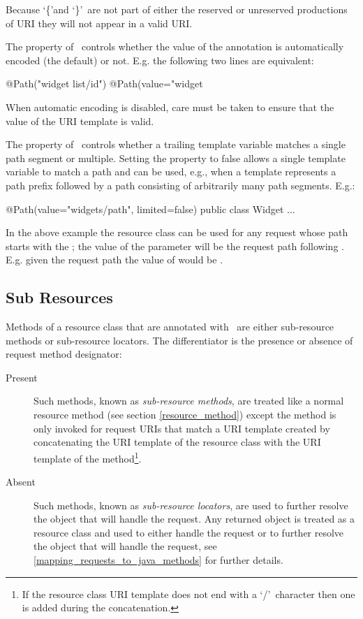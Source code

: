 \begin{nnnote}Because \lq\{\rq and \lq\}\rq\ are not part of either the reserved or unreserved productions of URI\cite{uri} they will not appear in a valid URI.\end{nnnote}

The  property of \Path\ controls whether the value of the annotation is automatically encoded (the default) or not. E.g. the following two lines are equivalent:

\begin{listing}{1}
@Path("widget list/{id}")
@Path(value="widget%
\end{listing}

When automatic encoding is disabled, care must be taken to ensure that the value of the URI template is valid.

The  property of \Path\ controls whether a trailing template variable matches a single path segment or multiple. Setting the property to false allows a single template variable to match a path and can be used, e.g., when a template represents a path prefix followed by a path consisting of arbitrarily many path segments. E.g.:

\begin{listing}{1}
@Path(value="widgets/{path}", limited=false)
public class Widget {
  ...
}\end{listing}

In the above example the  resource class can be used for any request whose path starts with the ; the value of the  parameter will be the request path following . E.g. given the request path  the value of  would be .

\subsection{Sub Resources}
\label{sub_resources}

Methods of a resource class that are annotated with \Path\ are either sub-resource methods or sub-resource locators. The differentiator is the presence or absence of request method designator:

\begin{description}
\item[Present] Such methods, known as {\em sub-resource methods}, are treated like a normal resource method (see section \ref{resource_method}) except the method is only invoked for request URIs that match a URI template created by concatenating the URI template of the resource class with the URI template of the method\footnote{If the resource class URI template does not end with a \lq/\rq\ character then one is added during the concatenation.}.
\item[Absent] Such methods, known as {\em sub-resource locators}, are used to further resolve the object that will handle the request. Any returned object is treated as a resource class and used to either handle the request or to further resolve the object that will handle the request, see \ref{mapping_requests_to_java_methods} for further details.
\end{description}

